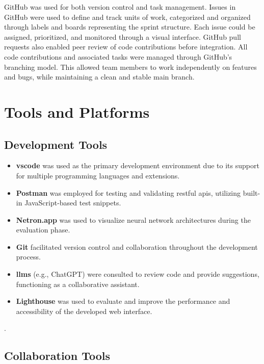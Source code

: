 GitHub was used for both version control and task management. Issues in GitHub were used to define and track units of work, categorized and organized through labels and boards representing the sprint structure. Each issue could be assigned, prioritized, and monitored through a visual interface. GitHub pull requests also enabled peer review of code contributions before integration. All code contributions and associated tasks were managed through GitHub's branching model. This allowed team members to work independently on features and bugs, while maintaining a clean and stable main branch. \\

\section{Tools and Platforms}
\label{sec:tools-and-platforms}

\subsection*{Development Tools}
\label{subsec:development-tools}

\begin{itemize}
    \item \textbf{\acrlong{vscode}} was used as the primary development environment due to its support for multiple programming languages and extensions.
\item \textbf{Postman} was employed for testing and validating \acrshort{rest}ful \glspl{api}, utilizing built-in JavaScript-based test snippets.
\item \textbf{Netron.app} was used to visualize neural network architectures during the evaluation phase.
\item \textbf{Git} facilitated version control and collaboration throughout the development process.
\item \textbf{\glspl{llm}} (e.g., ChatGPT) were consulted to review code and provide suggestions, functioning as a collaborative assistant.
\item \textbf{Lighthouse} was used to evaluate and improve the performance and accessibility of the developed web interface.
\end{itemize}.

\subsection*{Collaboration Tools}
\label{subsec:collaboration-and-design-tools}


